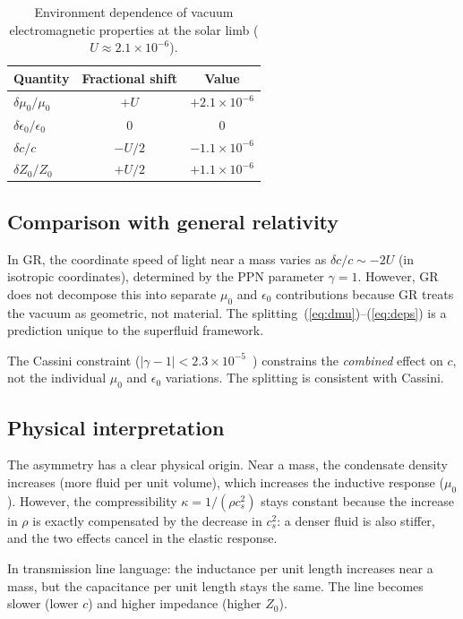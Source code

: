 \documentclass[12pt, a4paper]{article}
\begin{document}
\begin{table}[H]
\centering
\caption{Environment dependence of vacuum
electromagnetic properties at the solar limb
($U \approx 2.1 \times 10^{-6}$).}
\begin{tabular}{lcc}
\hline
Quantity & Fractional shift & Value \\
\hline
$\delta\mu_0/\mu_0$ & $+U$ & $+2.1 \times 10^{-6}$ \\
$\delta\epsilon_0/\epsilon_0$ & $0$ & $0$ \\
$\delta c/c$ & $-U/2$ & $-1.1 \times 10^{-6}$ \\
$\delta Z_0/Z_0$ & $+U/2$ & $+1.1 \times 10^{-6}$ \\
\hline
\end{tabular}
\label{tab:splitting}
\end{table}

\subsection{Comparison with general relativity}

In GR, the coordinate speed of light near a mass
varies as $\delta c/c \sim -2U$ (in isotropic
coordinates), determined by the PPN parameter
$\gamma = 1$. However, GR does not decompose this
into separate $\mu_0$ and $\epsilon_0$ contributions
because GR treats the vacuum as geometric, not
material. The splitting~(\ref{eq:dmu})--(\ref{eq:deps})
is a prediction unique to the superfluid framework.

The Cassini constraint ($|\gamma - 1| < 2.3 \times
10^{-5}$~\cite{bertotti_2003}) constrains the
\emph{combined} effect on $c$, not the individual
$\mu_0$ and $\epsilon_0$ variations. The splitting
is consistent with Cassini.

\subsection{Physical interpretation}

The asymmetry has a clear physical origin. Near a
mass, the condensate density increases (more fluid
per unit volume), which increases the inductive
response ($\mu_0$). However, the compressibility
$\kappa = 1/(\rho c_s^2)$ stays constant because
the increase in $\rho$ is exactly compensated by the
decrease in $c_s^2$: a denser fluid is also stiffer,
and the two effects cancel in the elastic response.

In transmission line language: the inductance per
unit length increases near a mass, but the
capacitance per unit length stays the same. The line
becomes slower (lower $c$) and higher impedance
(higher $Z_0$).
\end{document}
